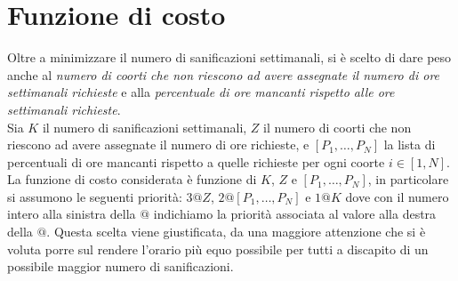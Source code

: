 \documentclass[12pt,english, openany]{book}
\begin{document}
\section{Funzione di costo}
Oltre a minimizzare il numero di sanificazioni settimanali, si è scelto di dare peso anche al \textit{numero di coorti che non riescono ad avere assegnate il numero di ore settimanali richieste} e alla \textit{percentuale di ore mancanti rispetto alle ore settimanali richieste}.\\
Sia $K$ il numero di sanificazioni settimanali, $Z$ il numero di coorti che non riescono ad avere assegnate il numero di ore richieste, e $\left[P_1, \dots, P_N \right]$ la lista di percentuali di ore mancanti rispetto a quelle richieste per ogni coorte $i \in \left[1, N \right]$.\\
La funzione di costo considerata è funzione di $K$, $Z$ e $\left[P_1, \dots, P_N \right]$, in particolare si assumono le seguenti priorità: $3@Z$, $2@\left[P_1, \dots, P_N \right]$ e $1@K$ dove con il numero intero alla sinistra della $@$ indichiamo la priorità associata al valore alla destra della $@$.
Questa scelta viene giustificata, da una maggiore attenzione che si è voluta porre sul rendere l'orario più equo possibile per tutti a discapito di un possibile maggior numero di sanificazioni.
\end{document}

